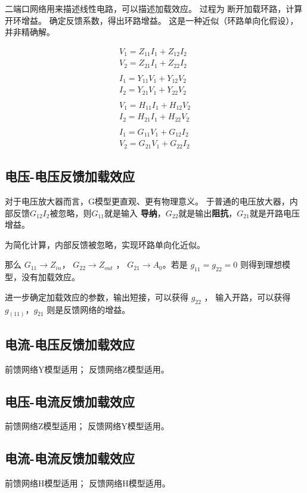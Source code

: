 \documentclass[cn,11pt,chinese,black,simple]{../elegantbook}
\begin{document}
二端口网络用来描述线性电路，可以描述加载效应。
过程为
断开加载环路，计算开环增益。
确定反馈系数，得出环路增益。
这是一种近似（环路单向化假设），并非精确解。


\[\begin{array}{l}
    V_{1}=Z_{11} I_{1}+Z_{12} I_{2} \\
    V_{2}=Z_{21} I_{1}+Z_{22} I_{2} \\
    \\
    I_{1}=Y_{11} V_{1}+Y_{12} V_{2} \\
    I_{2}=Y_{21} V_{1}+Y_{22} V_{2} \\
    \\
    V_{1}=H_{11} I_{1}+H_{12} V_{2} \\
    I_{2}=H_{21} I_{1}+H_{22} V_{2} \\
    \\
    I_{1}=G_{11} V_{1}+G_{12} I_{2} \\
    V_{2}=G_{21} V_{1}+G_{22} I_{2}
\end{array}\]

\subsection{电压-电压反馈加载效应}

对于电压放大器而言，G模型更直观、更有物理意义。
于普通的电压放大器，内部反馈\(G_{12}I_2\)被忽略，则\(G_{11}\)就是输入
\textbf{导纳}，\(G_{22}\)就是输出\textbf{阻抗}，\(G_{21}\)就是开路电压增益。

为简化计算，内部反馈被忽略，实现环路单向化近似。

那么 \(G_{11} \rightarrow Z_{in}\)， \(G_{22} \rightarrow Z_{out}\) ， \(G_{21} \rightarrow A_0\)。若是 \(g_{11} = g_{22} = 0\) 则得到理想模型，没有加载效应。


进一步确定加载效应的参数，输出短接，可以获得 \(g_{22}\) ， 输入开路，可以获得 \(g_(11)\)，\(g_{21}\) 则是反馈网络的增益。

\subsection{电流-电压反馈加载效应}

前馈网络Y模型适用；
反馈网络Z模型适用。


\subsection{电压-电流反馈加载效应}

前馈网络Z模型适用；
反馈网络Y模型适用。


\subsection{电流-电流反馈加载效应}

前馈网络H模型适用；
反馈网络H模型适用。



\ifx\mainclass\undefined
\end{document}
